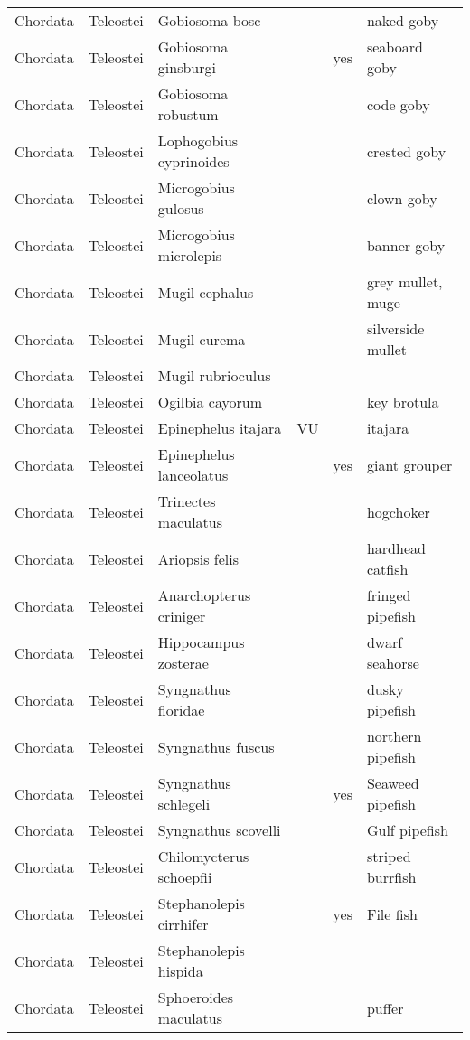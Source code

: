 \begin{longtable}{llllll}
  Chordata & Teleostei & Gobiosoma bosc &  &  & naked goby \\ 
  Chordata & Teleostei & Gobiosoma ginsburgi &  & yes & seaboard goby \\ 
  Chordata & Teleostei & Gobiosoma robustum &  &  & code goby \\ 
  Chordata & Teleostei & Lophogobius cyprinoides &  &  & crested goby \\ 
  Chordata & Teleostei & Microgobius gulosus &  &  & clown goby \\ 
  Chordata & Teleostei & Microgobius microlepis &  &  & banner goby \\ 
  Chordata & Teleostei & Mugil cephalus &  &  & grey mullet, muge \\ 
  Chordata & Teleostei & Mugil curema &  &  & silverside mullet \\ 
  Chordata & Teleostei & Mugil rubrioculus &  &  &  \\ 
  Chordata & Teleostei & Ogilbia cayorum &  &  & key brotula \\ 
  Chordata & Teleostei & Epinephelus itajara & VU &  & itajara \\ 
  Chordata & Teleostei & Epinephelus lanceolatus &  & yes & giant grouper \\ 
  Chordata & Teleostei & Trinectes maculatus &  &  & hogchoker \\ 
  Chordata & Teleostei & Ariopsis felis &  &  & hardhead catfish \\ 
  Chordata & Teleostei & Anarchopterus criniger &  &  & fringed pipefish \\ 
  Chordata & Teleostei & Hippocampus zosterae &  &  & dwarf seahorse \\ 
  Chordata & Teleostei & Syngnathus floridae &  &  & dusky pipefish \\ 
  Chordata & Teleostei & Syngnathus fuscus &  &  & northern pipefish \\ 
  Chordata & Teleostei & Syngnathus schlegeli &  & yes & Seaweed pipefish \\ 
  Chordata & Teleostei & Syngnathus scovelli &  &  & Gulf pipefish \\ 
  Chordata & Teleostei & Chilomycterus schoepfii &  &  & striped burrfish \\ 
  Chordata & Teleostei & Stephanolepis cirrhifer &  & yes & File fish \\ 
  Chordata & Teleostei & Stephanolepis hispida &  &  &  \\ 
  Chordata & Teleostei & Sphoeroides maculatus &  &  & puffer \\ 

\end{longtable}

